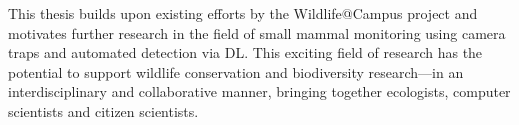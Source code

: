 This thesis builds upon existing efforts by the Wildlife@Campus project and motivates further research in the field of small mammal monitoring using camera traps and automated detection via \ac{DL}.
This exciting field of research has the potential to support wildlife conservation and biodiversity research---in an interdisciplinary and collaborative manner, bringing together ecologists, computer scientists and citizen scientists.
